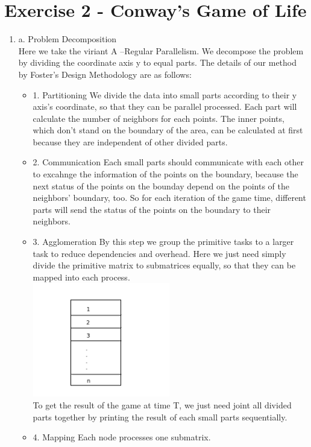 \documentclass[a4paper, 14pt]{article}
\begin{document}
\section{Exercise 2 - Conway's Game of Life}
\begin{enumerate}
\item{a. Problem Decomposition}\\
Here we take the viriant A --Regular Parallelism. We decompose the problem by dividing the coordinate axis y to equal parts. The details of our method by Foster's Design Methodology are as follows: \\
\begin{itemize}
\item{1. Partitioning} We divide the data into small parts according to their y axis's coordinate, so that they can be parallel processed. Each part will calculate the number of neighbors for each points. The inner points, which don't stand on the boundary of the area, can be calculated at first because they are independent of other divided parts.
\item{2. Communication} Each small parts should communicate with each other to excahnge the information of the points on the boundary, because the next status of the points on the bounday depend on the points of the neighbors' boundary, too. So for each iteration of the game time, different parts will send the status of the points on the boundary to their neighbors.
\item{3. Agglomeration} By this step we group the primitive tasks to a larger task to reduce dependencies and overhead. Here we just need simply divide the primitive  matrix to submatrices equally, so that they can be mapped into each process. \\
\includegraphics[width=6cm]{conway.png}
\\
To get the result of the game at time T, we just need joint all divided parts together by printing the result of each small parts sequentially. 
\item{4. Mapping} Each node processes one submatrix.
\end{itemize}


\end{enumerate}
\end{document}
